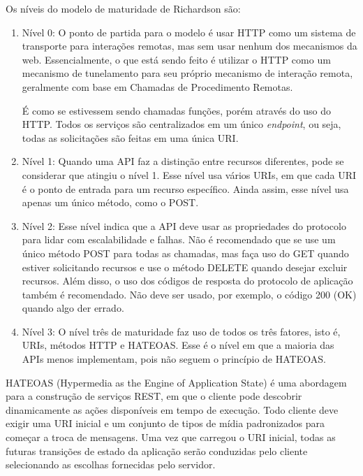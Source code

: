 Os níveis do modelo de maturidade de Richardson são:

\begin{enumerate}[label=\alph*)]

\item Nível 0: O ponto de partida para o modelo é usar HTTP como um sistema de transporte para interações remotas, mas sem usar nenhum dos mecanismos da web. Essencialmente, o que está sendo feito é utilizar o HTTP como um mecanismo de tunelamento para seu próprio mecanismo de interação remota, geralmente com base em Chamadas de Procedimento Remotas. 

É como se estivessem sendo chamadas funções, porém através do uso do HTTP. Todos os serviços são centralizados em um único \textit{endpoint}, ou seja, todas as solicitações são feitas em uma única URI.

\item Nível 1: Quando uma API faz a distinção entre recursos diferentes, pode se considerar que atingiu o nível 1. Esse nível usa vários URIs, em que cada URI é o ponto de entrada para um recurso específico. Ainda assim, esse nível usa apenas um único método, como o POST.

\item Nível 2: Esse nível indica que a API deve usar as propriedades do protocolo para lidar com escalabilidade e falhas. Não é recomendado que se use um único método POST para todas as chamadas, mas faça uso do GET quando estiver solicitando recursos e use o método DELETE quando desejar excluir recursos. Além disso, o uso dos códigos de resposta do protocolo de aplicação também é recomendado. Não deve ser usado, por exemplo, o código 200 (OK) quando algo der errado.

\item Nível 3: O nível três de maturidade faz uso de todos os três fatores, isto é, URIs, métodos HTTP e HATEOAS. Esse é o nível em que a maioria das APIs menos implementam, pois não seguem o princípio de HATEOAS.

\end{enumerate}

HATEOAS (Hypermedia as the Engine of Application State) é uma abordagem para a construção de serviços REST, em que o cliente pode descobrir dinamicamente as ações disponíveis em tempo de execução. Todo cliente deve exigir uma URI inicial e um conjunto de tipos de mídia padronizados para começar a troca de mensagens. Uma vez que carregou o URI inicial, todas as futuras transições de estado da aplicação serão conduzidas pelo cliente selecionando as escolhas fornecidas pelo servidor.

